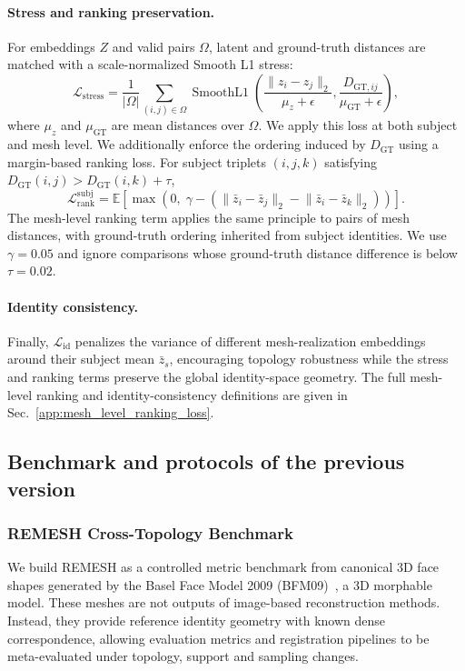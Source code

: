 \paragraph{Stress and ranking preservation.}
For embeddings $Z$ and valid pairs $\Omega$, latent and ground-truth distances
are matched with a scale-normalized Smooth L1 stress:
\begin{equation}
\mathcal L_{\mathrm{stress}}
=
\frac{1}{|\Omega|}
\sum_{(i,j)\in\Omega}
\operatorname{SmoothL1}
\left(
\frac{\lVert z_i-z_j\rVert_2}{\mu_z+\epsilon},
\frac{D_{\mathrm{GT},ij}}{\mu_{\mathrm{GT}}+\epsilon}
\right),
\end{equation}
where $\mu_z$ and $\mu_{\mathrm{GT}}$ are mean distances over $\Omega$. We apply
this loss at both subject and mesh level. We additionally enforce the ordering
induced by $D_{\mathrm{GT}}$ using a margin-based ranking loss. For subject
triplets $(i,j,k)$ satisfying
$D_{\mathrm{GT}}(i,j)>D_{\mathrm{GT}}(i,k)+\tau$,
\begin{equation}
\mathcal L^{\mathrm{subj}}_{\mathrm{rank}}
=
\mathbb E
\left[
\max
\left(
0,\;
\gamma -
\left(
\lVert \bar z_i-\bar z_j\rVert_2
-
\lVert \bar z_i-\bar z_k\rVert_2
\right)
\right)
\right].
\end{equation}
The mesh-level ranking term applies the same principle to pairs of mesh
distances, with ground-truth ordering inherited from subject identities. We use
$\gamma=0.05$ and ignore comparisons whose ground-truth distance difference is
below $\tau=0.02$.

\paragraph{Identity consistency.}
Finally, $\mathcal L_{\mathrm{id}}$ penalizes the variance of different
mesh-realization embeddings around their subject mean $\bar z_s$, encouraging
topology robustness while the stress and ranking terms preserve the global
identity-space geometry. The full mesh-level ranking and identity-consistency
definitions are given in Sec.~\ref{app:mesh_level_ranking_loss}.

\subsection{Benchmark and protocols of the previous version}
\subsubsection{REMESH Cross-Topology Benchmark}
\label{sec:remesh_benchmark}
We build REMESH as a controlled metric benchmark from canonical 3D face shapes generated by the Basel Face Model 2009 (BFM09)~\cite{paysan2009bfm}, a 3D morphable model. These meshes are not outputs of image-based reconstruction methods. Instead, they provide reference identity geometry with known dense correspondence, allowing evaluation metrics and registration pipelines to be meta-evaluated under topology, support and sampling changes.

